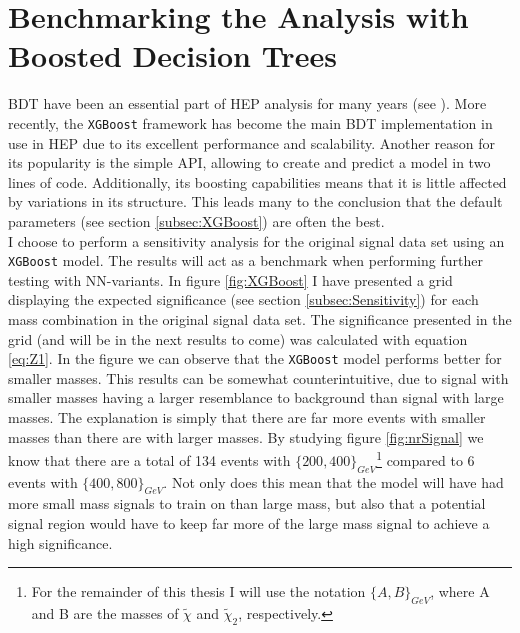 \section{Benchmarking the Analysis with Boosted Decision Trees}\label{sec:XGBoost}
\ac{BDT} have been an essential part of \acf{HEP} analysis for many years (see 
\cite{ATLAS-CONF-2011-152,ATLAS-CONF-2017-064}). More recently, the \verb!XGBoost! 
framework has become the main BDT implementation in use in \ac{HEP} due 
to its excellent performance and scalability. Another reason for its popularity is the simple \acf{API}, allowing 
to create and predict a model in two lines of code. Additionally, its boosting capabilities means 
that it is little affected by variations in its structure. This leads many to the conclusion that the default 
parameters (see section \ref{subsec:XGBoost}) are often the best. 
\\
I choose to perform a sensitivity analysis for the original signal data set using an \verb!XGBoost! model. The results
will act as a benchmark when performing further testing with \ac{NN}-variants. In figure \ref{fig:XGBoost} 
I have presented a grid displaying the expected significance (see section \ref{subsec:Sensitivity}) for each 
mass combination in the original signal data set. The significance presented in the grid (and will be in the next results to come) 
was calculated with equation \ref{eq:Z1}. In the figure we can observe that the \verb!XGBoost! model performs
better for smaller masses. This results can be somewhat counterintuitive, due to signal with smaller masses 
having a larger resemblance to background than signal with large masses. The explanation is simply that there are
far more events with smaller masses than there are with larger masses. By studying figure \ref{fig:nrSignal} we know that 
there are a total of 134 events with $\{200,400\}_{GeV}$\footnote{For the remainder of this thesis I will use the notation $\{A,B\}_{GeV}$, 
where A and B are the masses of $\tilde{\chi}$ and $\tilde{\chi}_2$, respectively.} compared to 6 events 
with $\{400,800\}_{GeV}$. Not only does this mean that the model will have had more small mass signals to 
train on than large mass, but also that a potential signal region would have to keep far more of the large 
mass signal to achieve a high significance.\\
